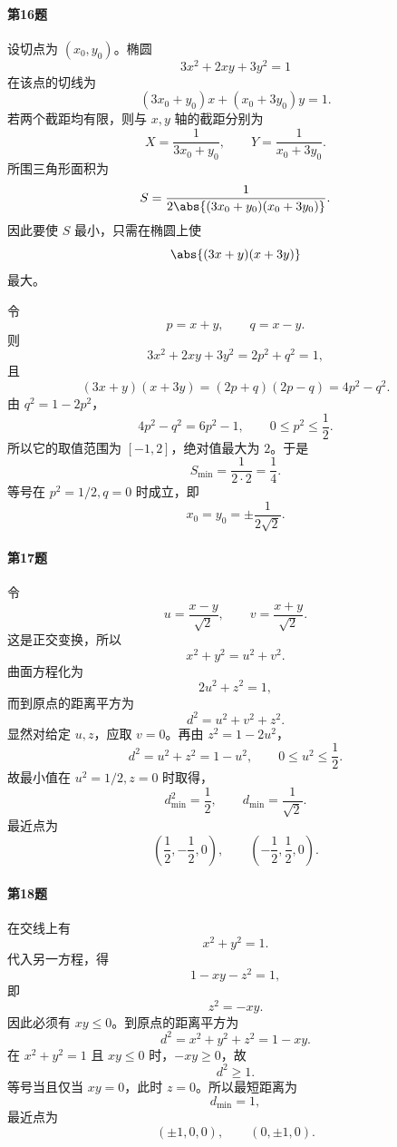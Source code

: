 \paragraph{第16题}
\begin{xsolution}
设切点为 $(x_0,y_0)$。椭圆
\[
  3x^2+2xy+3y^2=1
\]
在该点的切线为
\[
  (3x_0+y_0)x+(x_0+3y_0)y=1.
\]
若两个截距均有限，则与 $x,y$ 轴的截距分别为
\[
  X=\frac1{3x_0+y_0},
  \qquad
  Y=\frac1{x_0+3y_0}.
\]
所围三角形面积为
\[
  S=\frac1{2\abs{(3x_0+y_0)(x_0+3y_0)}}.
\]
因此要使 $S$ 最小，只需在椭圆上使
\[
  \abs{(3x+y)(x+3y)}
\]
最大。

令
\[
  p=x+y,
  \qquad
  q=x-y.
\]
则
\[
  3x^2+2xy+3y^2=2p^2+q^2=1,
\]
且
\[
  (3x+y)(x+3y)=(2p+q)(2p-q)=4p^2-q^2.
\]
由 $q^2=1-2p^2$，
\[
  4p^2-q^2=6p^2-1,
  \qquad 0\le p^2\le\frac12.
\]
所以它的取值范围为 $[-1,2]$，绝对值最大为 $2$。于是
\[
  S_{\min}=\frac1{2\cdot2}=\frac14.
\]
等号在 $p^2=1/2,q=0$ 时成立，即
\[
  x_0=y_0=\pm\frac1{2\sqrt2}.
\]
\end{xsolution}

\paragraph{第17题}
\begin{xsolution}
令
\[
  u=\frac{x-y}{\sqrt2},
  \qquad
  v=\frac{x+y}{\sqrt2}.
\]
这是正交变换，所以
\[
  x^2+y^2=u^2+v^2.
\]
曲面方程化为
\[
  2u^2+z^2=1,
\]
而到原点的距离平方为
\[
  d^2=u^2+v^2+z^2.
\]
显然对给定 $u,z$，应取 $v=0$。再由 $z^2=1-2u^2$，
\[
  d^2=u^2+z^2=1-u^2,
  \qquad 0\le u^2\le\frac12.
\]
故最小值在 $u^2=1/2,z=0$ 时取得，
\[
  d_{\min}^2=\frac12,
  \qquad
  d_{\min}=\frac1{\sqrt2}.
\]
最近点为
\[
  \left(\frac12,-\frac12,0\right),
  \qquad
  \left(-\frac12,\frac12,0\right).
\]
\end{xsolution}

\paragraph{第18题}
\begin{xsolution}
在交线上有
\[
  x^2+y^2=1.
\]
代入另一方程，得
\[
  1-xy-z^2=1,
\]
即
\[
  z^2=-xy.
\]
因此必须有 $xy\le0$。到原点的距离平方为
\[
  d^2=x^2+y^2+z^2=1-xy.
\]
在 $x^2+y^2=1$ 且 $xy\le0$ 时，$-xy\ge0$，故
\[
  d^2\ge1.
\]
等号当且仅当 $xy=0$，此时 $z=0$。所以最短距离为
\[
  d_{\min}=1,
\]
最近点为
\[
  (\pm1,0,0),
  \qquad
  (0,\pm1,0).
\]
\end{xsolution}

